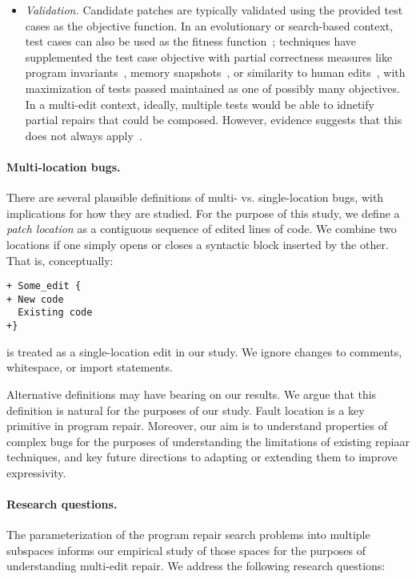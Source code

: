 \documentclass[sigconf, timestamp-false, anonymous=true]{acmart}
\begin{document}
\begin{itemize}
\item \emph{Validation.} Candidate patches are typically validated using the
  provided test cases as the objective function.  In an evolutionary or
  search-based context, test cases can also be used as the fitness
  function~\cite{genprog}; techniques have supplemented the test
  case objective with partial correctness measures like program
  invariants~\cite{dinglyu}, memory snapshots~\cite{source-code-checkpoint}, or
  similarity to human edits~\cite{hdrepair}, with maximization of tests passed
  maintained as one of possibly many objectives.  In a multi-edit context,
  ideally, multiple tests would be able to idnetify partial repairs that could
  be composed.  However, evidence suggests that this does not always
  apply~\cite{better-fitness,schulte}. 
\end{itemize}



\paragraph{Multi-location bugs.} There are several plausible definitions of multi- vs. single-location bugs, with
implications for how they are studied. For the purpose of this study, we define
a \emph{patch location} as a contiguous sequence of edited lines of
code.  We combine two locations if one simply opens or closes a syntactic block
inserted by the other. That is, conceptually:
\begin{lstlisting}
+ Some_edit {
+ New code
  Existing code 
+}
\end{lstlisting}
is treated as a single-location edit in our study.  We ignore changes to
comments, whitespace, or import statements. 

Alternative definitions may have bearing on our results.  We argue that this
definition is natural for the purposes of our study.  Fault location is a key
primitive in program repair. Moreover, our aim is to understand properties of 
complex bugs for the purposes of understanding the limitations of
existing repiaar techniques, and key future directions to
adapting or extending them to improve expressivity. 

\paragraph{Research questions.}  The parameterization of the program repair
search problems into multiple subspaces informs our empirical study of those
spaces for the purposes of understanding multi-edit repair.  We address the
following research questions:
\end{document}
